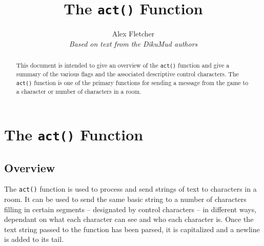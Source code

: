 \documentclass[11pt]{article}
\title{The \texttt{act()} Function}
\author{Alex Fletcher\\
{\it Based on text from the DikuMud authors}}
\begin{document}
\maketitle

\begin{abstract}
This document is intended to give an overview of the \texttt{act()} function and give a summary of the various flags and the associated descriptive control characters.  The \texttt{act()} function is one of the primary functions for sending a message from the game to a character or number of characters in a room.
\end{abstract}

\tableofcontents

\section{The \texttt{act()} Function}
\subsection{Overview}\label{overview}
The \texttt{act()} function is used to process and send strings of text to characters in a room.  It can be used to send the same basic string to a number of characters filling in certain segments -- designated by control characters -- in different ways, dependant on what each character can see and who each character is.  Once the text string passed to the function has been parsed, it is capitalized and a newline is added to its tail.
\end{document}

